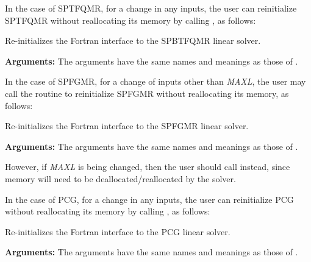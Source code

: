 \documentclass[letterpaper,10pt,english]{sphinxmanual}
\begin{document}
In the case of SPTFQMR, for a change in any inputs, the user can
reinitialize SPTFQMR without reallocating its memory by calling
{\hyperref[f_interface/Usage:f/_/FARKSPTFQMRREINIT]{}}, as follows:

\begin{fulllineitems}
\label{f_interface/Usage:f/_/FARKSPTFQMRREINIT}
Re-initializes the Fortran interface to the SPBTFQMR
linear solver.

\textbf{Arguments:}  The arguments have the same names and meanings as
those of {\hyperref[f_interface/Usage:f/_/FARKSPTFQMR]{}}.

\end{fulllineitems}


In the case of SPFGMR, for a change of inputs other than \emph{MAXL},
the user may call the routine {\hyperref[f_interface/Usage:f/_/FARKSPFGMRREINIT]{}} to
reinitialize SPFGMR without reallocating its memory, as follows:

\begin{fulllineitems}
\label{f_interface/Usage:f/_/FARKSPFGMRREINIT}
Re-initializes the Fortran interface to the SPFGMR
linear solver.

\textbf{Arguments:}  The arguments have the same names and meanings as
those of {\hyperref[f_interface/Usage:f/_/FARKSPFGMR]{}}.

\end{fulllineitems}


However, if \emph{MAXL} is being changed, then the user should call
{\hyperref[f_interface/Usage:f/_/FARKSPFGMR]{}} instead, since memory will need to be
deallocated/reallocated by the solver.

In the case of PCG, for a change in any inputs, the user can
reinitialize PCG without reallocating its memory by calling
{\hyperref[f_interface/Usage:f/_/FARKPCGREINIT]{}}, as follows:

\begin{fulllineitems}
\label{f_interface/Usage:f/_/FARKPCGREINIT}
Re-initializes the Fortran interface to the PCG
linear solver.

\textbf{Arguments:}  The arguments have the same names and meanings as
those of {\hyperref[f_interface/Usage:f/_/FARKPCG]{}}.

\end{fulllineitems}
\end{document}
